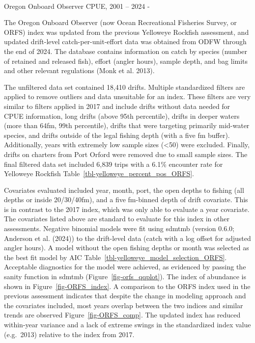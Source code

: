 \documentclass[
]{scrartcl}
\makeatletter
\let\oldparagraph\paragraph
\renewcommand{\paragraph}{
    \@ifstar
      \xxxParagraphStar
      \xxxParagraphNoStar
  }
\newcommand{\xxxParagraphStar}[1]{\oldparagraph*{#1}\mbox{}}
\newcommand{\xxxParagraphNoStar}[1]{\oldparagraph{#1}\mbox{}}
\makeatother
\begin{document}
\paragraph{Oregon Onboard Observer CPUE, 2001 -- 2024
-}\label{oregon-onboard-observer-cpue-2001-2024--}

The Oregon Onboard Observer (now Ocean Recreational Fisheries Survey, or
ORFS) index was updated from the previous Yelloweye Rockfish assessment,
and updated drift-level catch-per-unit-effort data was obtained from
ODFW through the end of 2024. The database contains information on catch
by species (number of retained and released fish), effort (angler
hours), sample depth, and bag limits and other relevant regulations
(Monk et al. 2013).

The unfiltered data set contained 18,410 drifts. Multiple standardized
filters are applied to remove outliers and data unsuitable for an index.
These filters are very similar to filters applied in 2017 and include
drifts without data needed for CPUE information, long drifts (above 95th
percentile), drifts in deeper waters (more than 64fm, 99th percentile),
drifts that were targeting primarily mid-water species, and drifts
outside of the legal fishing depth (with a five fm buffer).
Additionally, years with extremely low sample sizes (\textless50) were
excluded. Finally, drifts on charters from Port Orford were removed due
to small sample sizes. The final filtered data set included 6,839 trips
with a 6.1\% encounter rate for Yelloweye Rockfish
Table~\ref{tbl-yelloweye_percent_pos_ORFS}.

Covariates evaluated included year, month, port, the open depths to
fishing (all depths or inside 20/30/40fm), and a five fm-binned depth of
drift covariate. This is in contrast to the 2017 index, which was only
able to evaluate a year covariate. The covariates listed above are
standard to evaluate for this index in other assessments. Negative
binomial models were fit using \gls{sdmtmb} (version 0.6.0; Anderson et
al. (2024)) to the drift-level data (catch with a log offset for
adjusted angler hours). A model without the open fishing depths or month
was selected as the best fit model by AIC
Table~\ref{tbl-yelloweye_model_selection_ORFS}. Acceptable diagnostics
for the model were achieved, as evidenced by passing the sanity function
in \gls{sdmtmb} (Figure~\ref{fig-orfs_qqplot}). The index of abundance
is shown in Figure~\ref{fig-ORFS_index}. A comparison to the ORFS index
used in the previous assessment indicates that despite the change in
modeling approach and the covariates included, most years overlap
between the two indices and similar trends are observed
Figure~\ref{fig-ORFS_comp}. The updated index has reduced within-year
variance and a lack of extreme swings in the standardized index value
(e.g.~2013) relative to the index from 2017.
\end{document}
